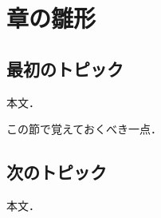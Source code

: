 \documentclass[../main.tex]{subfiles}
\begin{document}
\chapter{章の雛形}

\section{最初のトピック}

本文．

\begin{keypoint}
  この節で覚えておくべき一点．
\end{keypoint}

\section{次のトピック}

本文．
\end{document}
